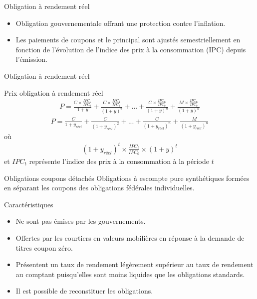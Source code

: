 \documentclass{beamer}
\begin{document}
\begin{frame}{Obligation à rendement réel}
\begin{itemize}
\item Obligation gouvernementale offrant une protection contre l’inflation.  
\item Les paiements de coupons et le principal sont ajustés semestriellement en fonction de l’évolution de l’indice des prix à la consommation (IPC) depuis l’émission.
\end{itemize}
\end{frame}


\begin{frame}{Obligation à rendement réel}
\begin{block}{Prix obligation à rendement réel}
\begin{align*}
P=\frac{C \times \frac{IPC_1}{IPC_0}}{1+y}+\frac{C \times \frac{IPC_2}{IPC_0}}{(1+y)^2}+...+\frac{C \times \frac{IPC_n}{IPC_0}}{(1+y)^n}+\frac{M \times \frac{IPC_n}{IPC_0}}{(1+y)^n}
\end{align*}
\begin{align*}
P=\frac{C}{1+y_{réel}}+\frac{C}{(1+y_{réel})^2}+...+\frac{C}{(1+y_{réel})^n}+\frac{M}{(1+y_{réel})^n}
\end{align*}
où
\begin{align*}
(1+y_{réel})^t \times \frac{IPC_t}{IPC_0} \times (1+y)^t
\end{align*}
et $IPC_t$ représente l'indice des prix à la consommation à la période $t$
\end{block}
\end{frame}



\begin{frame}{Obligations coupons détachés}
Obligations à escompte pure synthétiques formées en séparant les coupons des obligations fédérales individuelles.
\begin{block}{Caractéristiques}
\begin{itemize}
\item Ne sont pas émises par les gouvernements.
\item Offertes par les courtiers en valeurs mobilières en réponse à la demande de titres coupon zéro.
\item Présentent un taux de rendement légèrement supérieur au taux de rendement au comptant puisqu’elles sont moins liquides que les obligations standards.
\item Il est possible de reconstituer les obligations.
\end{itemize}
\end{block}
\end{frame}
\end{document}
